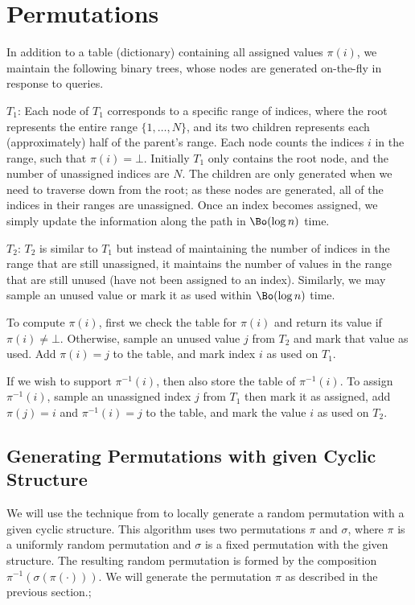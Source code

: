 \section{Permutations}


In addition to a table (dictionary) containing all assigned values $\pi(i)$, we maintain the following binary trees,
whose nodes are generated on-the-fly in response to queries.

$T_1$: Each node of $T_1$ corresponds to a specific range of indices,
where the root represents the entire range $\{1, \ldots, N\}$,
and its two children represents each (approximately) half of the parent's range.
Each node counts the indices $i$ in the range, such that $\pi(i) = \bot$.
Initially $T_1$ only contains the root node, and the number of unassigned indices are $N$.
The children are only generated when we need to traverse down from the root; as these nodes are generated,
all of the indices in their ranges are unassigned.
Once an index becomes assigned, we simply update the information along the path in $\Bo(\log n)$ time.

$T_2$: $T_2$ is similar to $T_1$ but instead of maintaining the number of indices in the range that are still unassigned,
it maintains the number of values in the range that are still unused (have not been assigned to an index).
Similarly, we may sample an unused value or mark it as used within $\Bo(\log n)$ time.

To compute $\pi(i)$, first we check the table for $\pi(i)$ and return its value if $\pi(i)\neq\bot$.
Otherwise, sample an unused value $j$ from $T_2$ and mark that value as used.
Add $\pi(i) = j$ to the table, and mark index $i$ as used on $T_1$.

If we wish to support $\pi^{-1}(i)$, then also store the table of $\pi^{-1}(i)$.
To assign $\pi^{-1}(i)$, sample an unassigned index $j$ from $T_1$ then mark it as assigned,
add $\pi(j)=i$ and $\pi^{-1}(i)=j$ to the table, and mark the value $i$ as used on $T_2$.

\subsection{Generating Permutations with given Cyclic Structure}
We will use the technique from \cite{cyclic} to locally generate a random permutation with a given cyclic structure.
This algorithm uses two permutations $\pi$ and $\sigma$,
where $\pi$ is a uniformly random permutation and $\sigma$ is a fixed permutation with the given structure.
The resulting random permutation is formed by the composition $\pi^{-1}(\sigma(\pi(\cdot)))$.
We will generate the permutation $\pi$ as described in the previous section.;



